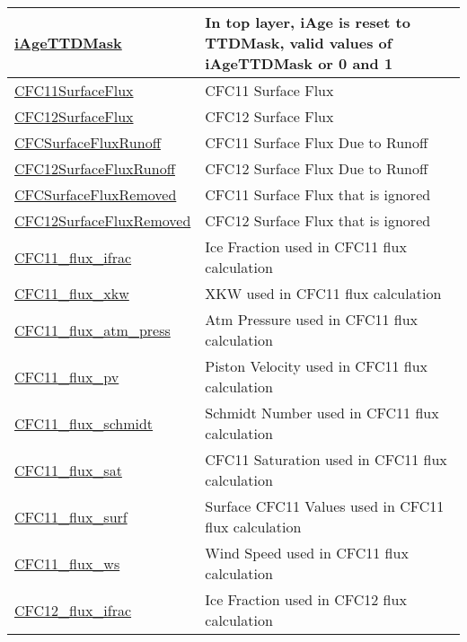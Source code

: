 {\begin{center}
\begin{longtable}{| p{2.0in} | p{4.0in} |}
    \hline
    \hyperref[subsec:var_sec_forcing_iAgeTTDMask]{iAgeTTDMask} & In top layer, iAge is reset to TTDMask, valid values of iAgeTTDMask or 0 and 1 \\
    \hline
    \hyperref[subsec:var_sec_forcing_CFC11SurfaceFlux]{CFC11SurfaceFlux} & CFC11 Surface Flux \\
    \hline
    \hyperref[subsec:var_sec_forcing_CFC12SurfaceFlux]{CFC12SurfaceFlux} & CFC12 Surface Flux \\
    \hline
    \hyperref[subsec:var_sec_forcing_CFCSurfaceFluxRunoff]{CFCSurfaceFluxRunoff} & CFC11 Surface Flux Due to Runoff \\
    \hline
    \hyperref[subsec:var_sec_forcing_CFC12SurfaceFluxRunoff]{CFC12SurfaceFluxRunoff} & CFC12 Surface Flux Due to Runoff \\
    \hline
    \hyperref[subsec:var_sec_forcing_CFCSurfaceFluxRemoved]{CFCSurfaceFluxRemoved} & CFC11 Surface Flux that is ignored \\
    \hline
    \hyperref[subsec:var_sec_forcing_CFC12SurfaceFluxRemoved]{CFC12SurfaceFluxRemoved} & CFC12 Surface Flux that is ignored \\
    \hline
    \hyperref[subsec:var_sec_forcing_CFC11_flux_ifrac]{CFC11\_flux\_ifrac} & Ice Fraction used in CFC11 flux calculation \\
    \hline
    \hyperref[subsec:var_sec_forcing_CFC11_flux_xkw]{CFC11\_flux\_xkw} & XKW used in CFC11 flux calculation \\
    \hline
    \hyperref[subsec:var_sec_forcing_CFC11_flux_atm_press]{CFC11\_flux\_atm\_press} & Atm Pressure used in CFC11 flux calculation \\
    \hline
    \hyperref[subsec:var_sec_forcing_CFC11_flux_pv]{CFC11\_flux\_pv} & Piston Velocity used in CFC11 flux calculation \\
    \hline
    \hyperref[subsec:var_sec_forcing_CFC11_flux_schmidt]{CFC11\_flux\_schmidt} & Schmidt Number used in CFC11 flux calculation \\
    \hline
    \hyperref[subsec:var_sec_forcing_CFC11_flux_sat]{CFC11\_flux\_sat} & CFC11 Saturation used in CFC11 flux calculation \\
    \hline
    \hyperref[subsec:var_sec_forcing_CFC11_flux_surf]{CFC11\_flux\_surf} & Surface CFC11 Values used in CFC11 flux calculation \\
    \hline
    \hyperref[subsec:var_sec_forcing_CFC11_flux_ws]{CFC11\_flux\_ws} & Wind Speed used in CFC11 flux calculation \\
    \hline
    \hyperref[subsec:var_sec_forcing_CFC12_flux_ifrac]{CFC12\_flux\_ifrac} & Ice Fraction used in CFC12 flux calculation \\

\end{longtable}
\end{center}}
